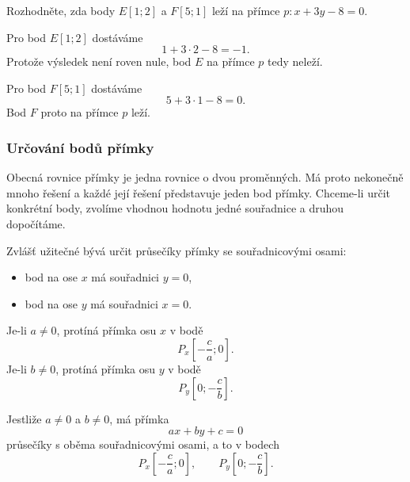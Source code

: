 \begin{example}\label{exa:Points_on_general_line}
    Rozhodněte, zda body $E[1;2]$ a $F[5;1]$ leží na přímce $p: x+3y-8=0$.

    Pro bod $E[1;2]$ dostáváme
    \[
        1+3\cdot2-8
        =
        -1.
    \]
    Protože výsledek není roven nule, bod $E$ na přímce $p$ tedy neleží.

    Pro bod $F[5;1]$ dostáváme
    \[
        5+3\cdot1-8
        =
        0.
    \]
    Bod $F$ proto na přímce $p$ leží.
\end{example}

\subsubsection{Určování bodů přímky}
\label{subsubsec:Finding_points_general_line}

Obecná rovnice přímky je jedna rovnice o dvou proměnných. Má proto
nekonečně mnoho řešení a každé její řešení představuje jeden bod
přímky. Chceme-li určit konkrétní body, zvolíme vhodnou hodnotu jedné
souřadnice a druhou dopočítáme.

Zvlášť užitečné bývá určit průsečíky přímky se souřadnicovými osami:
\begin{itemize}
    \item bod na ose $x$ má souřadnici $y=0$,
    \item bod na ose $y$ má souřadnici $x=0$.
\end{itemize}

Je-li $a\neq0$, protíná přímka osu $x$ v bodě
\begin{equation}\label{eq:General_line_x_intercept}
    P_x\left[-\frac{c}{a};0\right].
\end{equation}
Je-li $b\neq0$, protíná přímka osu $y$ v bodě
\begin{equation}\label{eq:General_line_y_intercept}
    P_y\left[0;-\frac{c}{b}\right].
\end{equation}

\begin{remark}
    Jestliže $a\neq0$ a $b\neq0$, má přímka
    \[
        ax+by+c=0
    \]
    průsečíky s oběma souřadnicovými osami, a to v bodech
    \[
        P_x\left[-\frac{c}{a};0\right],
        \qquad
        P_y\left[0;-\frac{c}{b}\right].
    \]
\end{remark}

